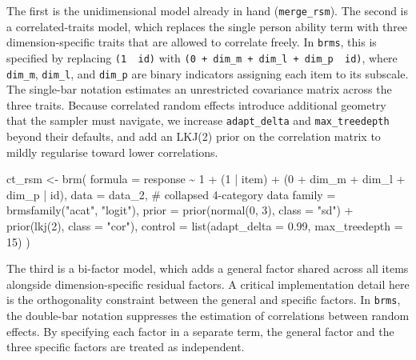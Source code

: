 \documentclass[
  man,
  floatsintext,
  longtable,
  nolmodern,
  notxfonts,
  notimes,
  colorlinks=true,linkcolor=blue,citecolor=blue,urlcolor=blue]{apa7}
\newenvironment{Shaded}{\begin{snugshade}}{\end{snugshade}}
\newcommand{\AttributeTok}[1]{\textcolor[rgb]{0.40,0.45,0.13}{#1}}
\newcommand{\CommentTok}[1]{\textcolor[rgb]{0.37,0.37,0.37}{#1}}
\newcommand{\DecValTok}[1]{\textcolor[rgb]{0.68,0.00,0.00}{#1}}
\newcommand{\FloatTok}[1]{\textcolor[rgb]{0.68,0.00,0.00}{#1}}
\newcommand{\FunctionTok}[1]{\textcolor[rgb]{0.28,0.35,0.67}{#1}}
\newcommand{\NormalTok}[1]{\textcolor[rgb]{0.00,0.23,0.31}{#1}}
\newcommand{\OtherTok}[1]{\textcolor[rgb]{0.00,0.23,0.31}{#1}}
\newcommand{\SpecialCharTok}[1]{\textcolor[rgb]{0.37,0.37,0.37}{#1}}
\newcommand{\StringTok}[1]{\textcolor[rgb]{0.13,0.47,0.30}{#1}}
\begin{document}
The first is the unidimensional model already in hand
(\texttt{merge\_rsm}). The second is a correlated-traits model, which
replaces the single person ability term with three dimension-specific
traits that are allowed to correlate freely. In \texttt{brms}, this is
specified by replacing \texttt{(1\ \textbar{}\ id)} with
\texttt{(0\ +\ dim\_m\ +\ dim\_l\ +\ dim\_p\ \textbar{}\ id)}, where
\texttt{dim\_m}, \texttt{dim\_l}, and \texttt{dim\_p} are binary
indicators assigning each item to its subscale. The single-bar notation
\texttt{\textbar{}} estimates an unrestricted covariance matrix across
the three traits. Because correlated random effects introduce additional
geometry that the sampler must navigate, we increase
\texttt{adapt\_delta} and \texttt{max\_treedepth} beyond their defaults,
and add an LKJ(2) prior on the correlation matrix to mildly regularise
toward lower correlations.

\begin{Shaded}
\begin{Highlighting}[]
\NormalTok{ct\_rsm }\OtherTok{\textless{}{-}} \FunctionTok{brm}\NormalTok{(}
  \AttributeTok{formula =}\NormalTok{ response }\SpecialCharTok{\textasciitilde{}} \DecValTok{1} \SpecialCharTok{+}\NormalTok{ (}\DecValTok{1} \SpecialCharTok{|}\NormalTok{ item) }\SpecialCharTok{+}
\NormalTok{    (}\DecValTok{0} \SpecialCharTok{+}\NormalTok{ dim\_m }\SpecialCharTok{+}\NormalTok{ dim\_l }\SpecialCharTok{+}\NormalTok{ dim\_p }\SpecialCharTok{|}\NormalTok{ id),}
  \AttributeTok{data =}\NormalTok{ data\_2,                        }\CommentTok{\# collapsed 4{-}category data}
  \AttributeTok{family =} \FunctionTok{brmsfamily}\NormalTok{(}\StringTok{"acat"}\NormalTok{, }\StringTok{"logit"}\NormalTok{),}
  \AttributeTok{prior =} \FunctionTok{prior}\NormalTok{(}\FunctionTok{normal}\NormalTok{(}\DecValTok{0}\NormalTok{, }\DecValTok{3}\NormalTok{), }\AttributeTok{class =} \StringTok{"sd"}\NormalTok{) }\SpecialCharTok{+}
          \FunctionTok{prior}\NormalTok{(}\FunctionTok{lkj}\NormalTok{(}\DecValTok{2}\NormalTok{), }\AttributeTok{class =} \StringTok{"cor"}\NormalTok{),}
  \AttributeTok{control =} \FunctionTok{list}\NormalTok{(}\AttributeTok{adapt\_delta =} \FloatTok{0.99}\NormalTok{, }\AttributeTok{max\_treedepth =} \DecValTok{15}\NormalTok{)}
\NormalTok{)}
\end{Highlighting}
\end{Shaded}

The third is a bi-factor model, which adds a general factor shared
across all items alongside dimension-specific residual factors. A
critical implementation detail here is the orthogonality constraint
between the general and specific factors. In \texttt{brms}, the
double-bar notation \texttt{\textbar{}\textbar{}} suppresses the
estimation of correlations between random effects. By specifying each
factor in a separate \texttt{\textbar{}\textbar{}} term, the general
factor and the three specific factors are treated as independent.
\end{document}
